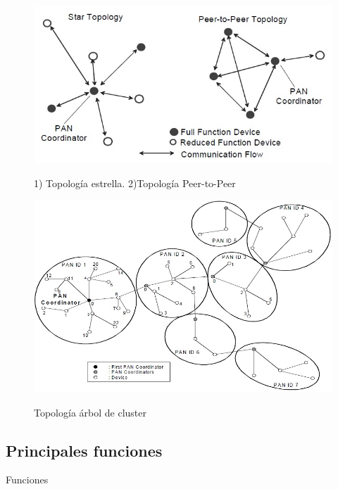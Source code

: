 \begin{figure}[h!]
	\centering
    \includegraphics[width=.8\textwidth]{./Figures/topologia.jpg}
	\label{fig:mote}
	\caption{1) Topología estrella. 2)Topología Peer-to-Peer}
\end{figure}

\begin{figure}[h!]
	\centering
    \includegraphics[width=.8\textwidth]{./Figures/cluster.jpg}
	\label{fig:mote}
	\caption{Topología árbol de cluster}
\end{figure}

\subsection{Principales funciones}

Funciones

